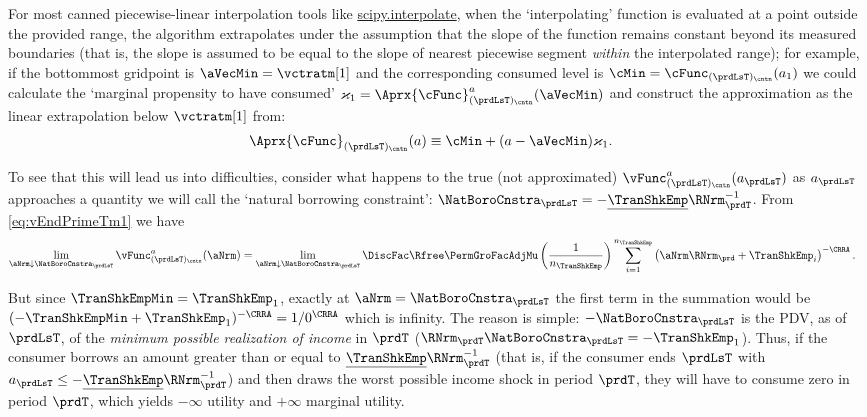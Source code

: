 \documentclass[\econtexRoot/SolvingMicroDSOPs]{subfiles}
\begin{document}
For most canned piecewise-linear interpolation tools like \href{https://docs.scipy.org/doc/scipy/tutorial/interpolate.html}{scipy.interpolate}, when the `interpolating' function is evaluated at a point outside the provided range, the algorithm extrapolates under the assumption that the slope of the function remains constant beyond its measured boundaries (that is, the slope is assumed to be equal to the slope of nearest piecewise segment \emph{within} the interpolated range); for example, if the bottommost gridpoint is $\aVecMin = \vctratm[1]$ and the corresponding consumed level is $\cMin = \cFunc_{(\prdLsT)_\cntn}(a_1)$ we could calculate the `marginal propensity to have consumed' $\varkappa_{1}=
\Aprx{\cFunc}_{(\prdLsT)_\cntn}^{a}(\aVecMin)$ and construct the approximation as the linear extrapolation below $\vctratm[1]$ from:
\begin{equation}\begin{gathered}\begin{aligned}
      \Aprx{\cFunc}_{(\prdLsT)_\cntn}(a)  &  \equiv \cMin + (a-\aVecMin)\varkappa_{1}  \label{eq:ExtrapLin}.
    \end{aligned}\end{gathered}\end{equation}

To see that this will lead us into difficulties, consider what happens to the true (not approximated) $\vFunc^{a}_{(\prdLsT)_\cntn}(a_{\prdLsT})$ as $a_{\prdLsT}$ approaches a quantity we will call the `natural borrowing constraint': $\NatBoroCnstra_{\prdLsT}=-\underline{\TranShkEmp}\RNrm_{\prdT}^{-1}$.  From
\eqref{eq:vEndPrimeTm1} we have
\begin{equation}\begin{gathered}\begin{aligned}
      \lim_{\aNrm \downarrow \NatBoroCnstra_{\prdLsT}} \vFunc^{a}_{(\prdLsT)_\cntn}(\aNrm)
      & =                                                                                         \lim_{\aNrm \downarrow \NatBoroCnstra_{\prdLsT}} \DiscFac \Rfree \PermGroFacAdjMu \left(\frac{1}{n_{\TranShkEmp}}\right) \sum_{i=1}^{n_{\TranShkEmp}} \left( \aNrm \RNrm_{\prd}+ \TranShkEmp_{i}\right)^{-\CRRA}.
    \end{aligned}\end{gathered}\end{equation}

But since $\TranShkEmpMin=\TranShkEmp_{1}$, exactly at $\aNrm=\NatBoroCnstra_{\prdLsT}$ the first term in the summation would be $(-\TranShkEmpMin+\TranShkEmp_{1})^{-\CRRA}=1/0^{\CRRA}$ which is infinity.  The reason is simple: $-\NatBoroCnstra_{\prdLsT}$ is the PDV, as of $\prdLsT$, of the \emph{minimum possible realization of income} in $\prdT$ ($\RNrm_{\prdT}\NatBoroCnstra_{\prdLsT} = -\TranShkEmp_{1}$).  Thus, if the consumer borrows an amount greater than or equal to $\underline{\TranShkEmp}\RNrm_{\prdT}^{-1}$ (that is, if the consumer ends $\prdLsT$ with $a_{\prdLsT} \leq -\underline{\TranShkEmp}\RNrm_{\prdT}^{-1}$) and then draws the worst possible income shock in period $\prdT$, they will have to consume zero in period $\prdT$, which yields $-\infty$ utility and $+\infty$ marginal utility.
\end{document}
